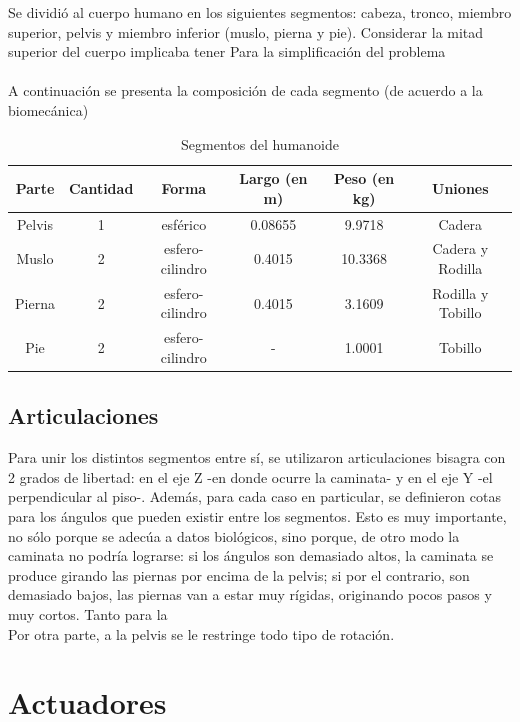 \documentclass{article}
\begin{document}
Se dividi\'o al cuerpo humano en los siguientes segmentos: cabeza, tronco, miembro superior, pelvis y miembro inferior (muslo, pierna y pie). Considerar la mitad superior del cuerpo implicaba tener    Para la simplificaci\'on del problema \\ \\
A continuaci\'on se presenta la composici\'on de cada segmento (de acuerdo a la biomec\'anica) 
\begin {table}[ht]
	\begin{center}
		\begin{tabular}{ | c | c | c | c | c | c |}
	  		 \hline
	  		Parte & Cantidad & Forma & Largo (en m) & Peso (en kg) & Uniones\\
	  		\hline 
	  		\hline
	  		Pelvis & 1 & esf\'erico & 0.08655 & 9.9718 & Cadera\\
	  		\hline
	  		Muslo & 2 & esfero-cilindro & 0.4015 & 10.3368 & Cadera y Rodilla\\
	  		\hline
	  		Pierna & 2 & esfero-cilindro &  0.4015 & 3.1609 & Rodilla y Tobillo\\
	  		\hline
	  		Pie & 2 & esfero-cilindro & - & 1.0001 & Tobillo\\
	  		\hline
		\end{tabular}
		\caption{Segmentos del humanoide}
	\end{center}
\end{table}

\subsection{Articulaciones}
Para unir los distintos segmentos entre s\'i, se utilizaron articulaciones bisagra con 2 grados de libertad: en el eje Z -en donde ocurre la caminata- y en el eje Y -el perpendicular al piso-. Adem\'as, para cada caso en particular, se definieron cotas para los \'angulos que pueden existir entre los segmentos. Esto es muy importante, no s\'olo porque se adec\'ua a datos biol\'ogicos, sino porque, de otro modo la caminata no podr\'ia lograrse: si los \'angulos son demasiado altos, la caminata se produce girando las piernas por encima de la pelvis; si por el contrario, son demasiado bajos, las piernas van a estar muy r\'igidas, originando pocos pasos y muy cortos. 
Tanto para la  \\
Por otra parte, a la pelvis se le restringe todo tipo de rotaci\'on. 

\section{Actuadores}
\end{document}
